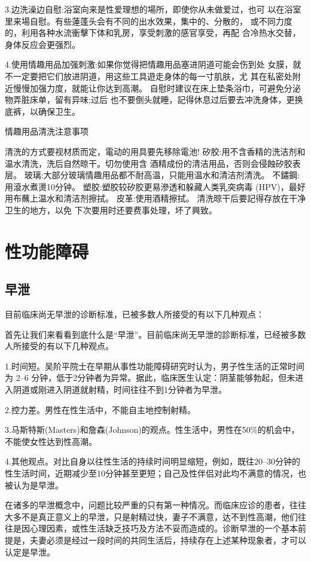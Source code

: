 \documentclass[12pt,UTF8]{ctexbook}
\begin{document}
3.边洗澡边自慰:浴室向来是性爱理想的場所，即使你从未做爱过，也可
以在浴室里来場自慰。有些蓮蓬头会有不同的出水效果，集中的、分散的，
或不同力度的，利用各种水流衝擊下体和乳房，享受刺激的感官享受，再配
合冷热水交替，身体反应会更强烈。

4.使用情趣用品加强刺激:如果你觉得把情趣用品塞进阴道可能会伤到处
女膜，就不一定要把它们放进阴道，用这些工具遊走身体的每一寸肌肤，尤
其在私密处附近慢慢加强力度，就能让你达到高潮。
自慰时建议在床上垫条浴巾，可避免分泌物弄脏床单，留有异味;过后
也不要倒头就睡，記得休息过后要去冲洗身体，更换底裤，以确保卫生。

情趣用品清洗注意事项

清洗的方式要视材质而定，電动的用具要先移除電池!
矽胶:用不含香精的洗洁剂和温水清洗，洗后自然晾干。切勿使用含
酒精成份的清洁用品，否则会侵蝕矽胶表层。
玻璃:大部分玻璃情趣用品都不耐高温，只能用温水和清洁剂清洗。
不鏽鋼:用滾水煮燙10分钟。
塑胶:塑胶较矽胶更易滲透和躲藏人类乳突病毒
(HPV)，最好用布蘸上温水和清洁剂擦拭。
皮革:使用酒精擦拭。
清洗晾干后要記得存放在干净卫生的地方，以免
下次要用时还要费事处理，坏了興致。

\part{性功能障碍}

\chapter{早泄}

目前临床尚无早泄的诊断标准，已被多数人所接受的有以下几种观点：

首先让我们来看看到底什么是“早泄”。目前临床尚无早泄的診断标准，已经被多数人所接受的有以下几种观点。

1.时间短。吴阶平院士在早期从事性功能障碍研究时认为，男子性生活的正常时间为 2--6 分钟，低于2分钟者为异常。据此，临床医生认定：阴茎能够勃起，但未进入阴道或刚进入阴道就射精，时间往往不到1分钟者为早泄。

2.控力差。男性在性生活中，不能自主地控制射精。

3.马斯特斯(Masters)和詹森(Johnson)的观点。性生活中，男性在50\%的机会中，不能使女性达到性高潮。

4.其他观点。对比自身以往性生活的持续时间明显缩短，例如，既往20--30分钟的性生活时间，近期减少至10分钟甚至更短；自己及性伴侣对此均不满意的情况，也被认为是早泄。

在诸多的早泄概念中，问题比较严重的只有第一种情况。而临床应诊的患者，往往大多不是真正意义上的早泄，只是射精过快，妻子不满意，达不到性高潮，他们往往是因心理因素，或性生活缺乏技巧及方法不妥而造成的。诊断早泄的一个基本前提是，夫妻必须是经过一段时间的共同生活后，持续存在上述某种现象者，才可以认定是早泄。
\end{document}
